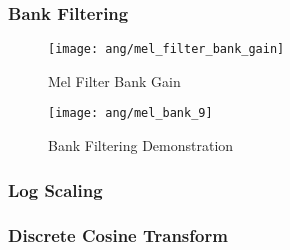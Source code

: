 \subsubsection{Bank Filtering}

\begin{figure}[H]
\centering
\texttt{[image: ang/mel\_filter\_bank\_gain]}
\caption{Mel Filter Bank Gain}
\end{figure}

\begin{figure}[H]
\centering
\texttt{[image: ang/mel\_bank\_9]}
\caption{Bank Filtering Demonstration}
\end{figure}


\subsubsection{Log Scaling}


\subsubsection{Discrete Cosine Transform}
